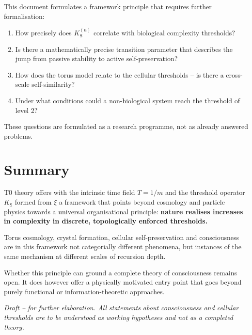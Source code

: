 	This document formulates a framework principle that requires further formalisation:
	\begin{enumerate}
		\item How precisely does $K_{\text{S}}^{(n)}$ correlate with biological complexity thresholds?
		\item Is there a mathematically precise transition parameter that describes the jump from passive stability to active self-preservation?
		\item How does the torus model relate to the cellular thresholds -- is there a cross-scale self-similarity?
		\item Under what conditions could a non-biological system reach the threshold of level 2?
	\end{enumerate}
	
	These questions are formulated as a research programme, not as already answered problems.
	
	\section{Summary}
	
	T0 theory offers with the intrinsic time field $T = 1/m$ and the threshold operator $K_{\text{S}}$ formed from $\xi$ a framework that points beyond cosmology and particle physics towards a universal organisational principle: \textbf{nature realises increases in complexity in discrete, topologically enforced thresholds.}
	
	Torus cosmology, crystal formation, cellular self-preservation and consciousness are in this framework not categorially different phenomena, but instances of the same mechanism at different scales of recursion depth.
	
	Whether this principle can ground a complete theory of consciousness remains open. It does however offer a physically motivated entry point that goes beyond purely functional or information-theoretic approaches.
	
	\vspace{1cm}
	\noindent
	\textit{Draft -- for further elaboration. All statements about consciousness and cellular thresholds are to be understood as working hypotheses and not as a completed theory.}
